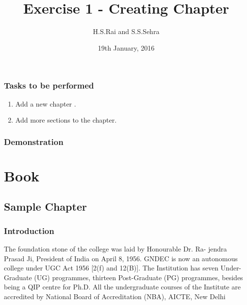 \documentclass[a4paper,12pt,twoside]{book}
\title{Exercise 1 - Creating Chapter}
\author{H.S.Rai and S.S.Sehra}
\date{19th January, 2016}
\begin{document}
	\maketitle	
	\section*{Tasks to be performed}
	\begin{enumerate}	
		\item Add a new chapter .
	\item Add more sections to the chapter.
	\end{enumerate}
	\section*{Demonstration}
	\part*{Book}
\chapter{Sample Chapter}
\section{Introduction}
The foundation stone of the college was laid by Honourable Dr. Ra-
jendra Prasad Ji, President of India on April 8, 1956. GNDEC is now an
autonomous college under UGC Act 1956 [2(f) and 12(B)]. The Institution
has seven Under-Graduate (UG) programmes, thirteen Post-Graduate (PG)
programmes, besides being a QIP centre for Ph.D. All the undergraduate
courses of the Institute are accredited by National Board of Accreditation
(NBA), AICTE, New Delhi
\end{document}
